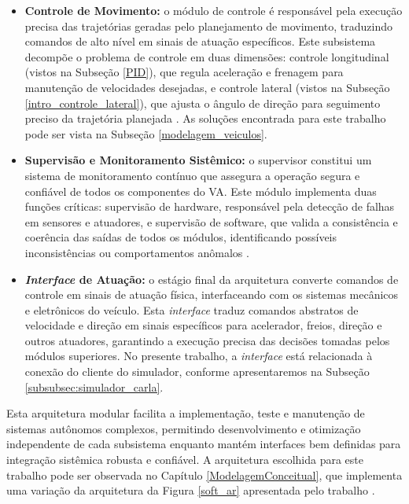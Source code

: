 \begin{itemize}
\item \textbf{Controle de Movimento:} o módulo de controle é responsável pela execução precisa das trajetórias geradas pelo planejamento de movimento, traduzindo comandos de alto nível em sinais de atuação específicos. Este subsistema decompõe o problema de controle em duas dimensões: controle longitudinal (vistos na Subseção \ref{PID}), que regula aceleração e frenagem para manutenção de velocidades desejadas, e controle lateral (vistos na Subseção \ref{intro_controle_lateral}), que ajusta o ângulo de direção para seguimento preciso da trajetória planejada \cite[Week 2 - Lesson 3: Software Architecture. ~10min54s]{University_of_Toronto2018-fe}. As soluções encontrada para este trabalho pode ser vista na Subseção \ref{modelagem_veiculos}.

\item \textbf{Supervisão e Monitoramento Sistêmico:} o supervisor constitui um sistema de monitoramento contínuo que assegura a operação segura e confiável de todos os componentes do VA. Este módulo implementa duas funções críticas: supervisão de hardware, responsável pela detecção de falhas em sensores e atuadores, e supervisão de software, que valida a consistência e coerência das saídas de todos os módulos, identificando possíveis inconsistências ou comportamentos anômalos \cite[Week 2 - Lesson 3: Software Architecture. ~11min37s]{University_of_Toronto2018-fe}.

\item \textbf{\textit{Interface} de Atuação:} o estágio final da arquitetura converte comandos de controle em sinais de atuação física, interfaceando com os sistemas mecânicos e eletrônicos do veículo. Esta \textit{interface} traduz comandos abstratos de velocidade e direção em sinais específicos para acelerador, freios, direção e outros atuadores, garantindo a execução precisa das decisões tomadas pelos módulos superiores. No presente trabalho, a \textit{interface} está relacionada à conexão do cliente do simulador, conforme apresentaremos na Subseção \ref{subsubsec:simulador_carla}.
\end{itemize}

Esta arquitetura modular facilita a implementação, teste e manutenção de sistemas autônomos complexos, permitindo desenvolvimento e otimização independente de cada subsistema enquanto mantém interfaces bem definidas para integração sistêmica robusta e confiável. A arquitetura escolhida para este trabalho pode ser observada no Capítulo \ref{ModelagemConceitual}, que implementa uma variação da arquitetura da Figura \ref{soft_ar} apresentada pelo trabalho .



